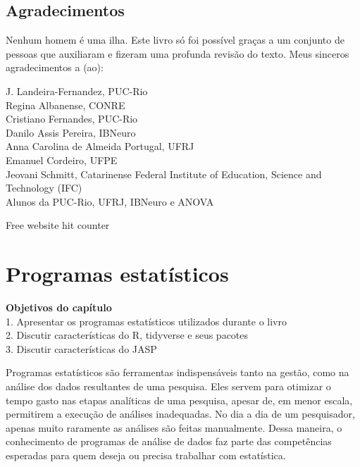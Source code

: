 \documentclass[
]{book}
\newenvironment{objectives}{
  \definecolor{shadecolor}{rgb}{0, 0, 0}  %
  \color{white}
  \begin{shaded}}
 {\end{shaded}}
\begin{document}
\hypertarget{agradecimentos}{%
\section{Agradecimentos}\label{agradecimentos}}

Nenhum homem é uma ilha. Este livro só foi possível graças a um conjunto de pessoas que auxiliaram e fizeram uma profunda revisão do texto. Meus sinceros agradecimentos a (ao):

J. Landeira-Fernandez, PUC-Rio\\
Regina Albanense, CONRE\\
Cristiano Fernandes, PUC-Rio\\
Danilo Assis Pereira, IBNeuro\\
Anna Carolina de Almeida Portugal, UFRJ\\
Emanuel Cordeiro, UFPE\\
Jeovani Schmitt, Catarinense Federal Institute of Education, Science and Technology (IFC)\\
Alunos da PUC-Rio, UFRJ, IBNeuro e ANOVA

Free website hit counter

\hypertarget{programas-estatuxedsticos}{%
\chapter{Programas estatísticos}\label{programas-estatuxedsticos}}

\begin{objectives}
\textbf{Objetivos do capítulo}\\
1. Apresentar os programas estatísticos utilizados durante o livro\\
2. Discutir características do R, tidyverse e seus pacotes\\
3. Discutir características do JASP

\end{objectives}

Programas estatísticos são ferramentas indispensáveis tanto na gestão, como na análise dos dados resultantes de uma pesquisa. Eles servem para otimizar o tempo gasto nas etapas analíticas de uma pesquisa, apesar de, em menor escala, permitirem a execução de análises inadequadas. No dia a dia de um pesquisador, apenas muito raramente as análises são feitas manualmente. Dessa maneira, o conhecimento de programas de análise de dados faz parte das competências esperadas para quem deseja ou precisa trabalhar com estatística.
\end{document}
